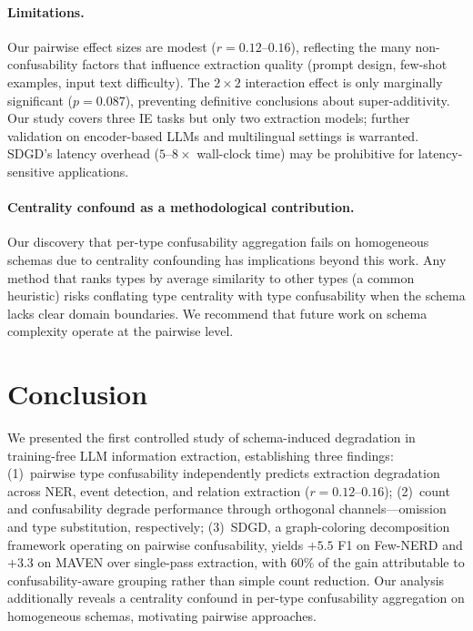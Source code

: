 \documentclass[11pt,a4paper]{article}
\begin{document}
\paragraph{Limitations.}
Our pairwise effect sizes are modest ($r{=}0.12$--$0.16$), reflecting the many non-confusability factors that influence extraction quality (prompt design, few-shot examples, input text difficulty).
The $2{\times}2$ interaction effect is only marginally significant ($p{=}0.087$), preventing definitive conclusions about super-additivity.
Our study covers three IE tasks but only two extraction models; further validation on encoder-based LLMs and multilingual settings is warranted.
SDGD's latency overhead ($5$--$8\times$ wall-clock time) may be prohibitive for latency-sensitive applications.

\paragraph{Centrality confound as a methodological contribution.}
Our discovery that per-type confusability aggregation fails on homogeneous schemas due to centrality confounding has implications beyond this work.
Any method that ranks types by average similarity to other types (a common heuristic) risks conflating type centrality with type confusability when the schema lacks clear domain boundaries.
We recommend that future work on schema complexity operate at the pairwise level.


\section{Conclusion}
\label{sec:conclusion}

We presented the first controlled study of schema-induced degradation in training-free LLM information extraction, establishing three findings:
(1)~pairwise type confusability independently predicts extraction degradation across NER, event detection, and relation extraction ($r{=}0.12$--$0.16$);
(2)~count and confusability degrade performance through orthogonal channels---omission and type substitution, respectively;
(3)~SDGD, a graph-coloring decomposition framework operating on pairwise confusability, yields $+5.5$ F1 on Few-NERD and $+3.3$ on MAVEN over single-pass extraction, with $60\%$ of the gain attributable to confusability-aware grouping rather than simple count reduction.
Our analysis additionally reveals a centrality confound in per-type confusability aggregation on homogeneous schemas, motivating pairwise approaches.
\end{document}
